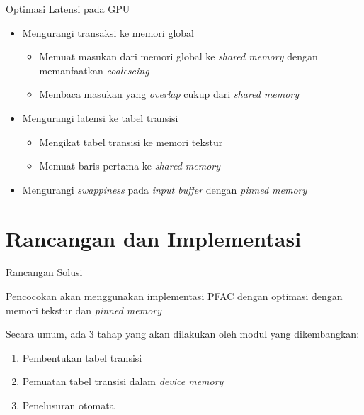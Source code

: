 \documentclass[10pt,xcolor=table]{beamer}
\begin{document}
\begin{frame}{Optimasi Latensi pada GPU}
    \begin{itemize}

        \item Mengurangi transaksi ke memori global
        \begin{itemize}
            \item Memuat masukan dari memori global ke \emph{shared memory} dengan memanfaatkan \emph{coalescing}
            \item Membaca masukan yang \emph{overlap} cukup dari \emph{shared memory}
        \end{itemize}

        \item Mengurangi latensi ke tabel transisi
        \begin{itemize}
            \item Mengikat tabel transisi ke memori tekstur
            \item Memuat baris pertama ke \emph{shared memory}
        \end{itemize}

        \item Mengurangi \emph{swappiness} pada \emph{input buffer} dengan \emph{pinned memory}

    \end{itemize}
\end{frame}

\section{Rancangan dan Implementasi}

\begin{frame}{Rancangan Solusi}
    
    Pencocokan akan menggunakan implementasi PFAC dengan optimasi dengan memori tekstur dan \emph{pinned memory}

    Secara umum, ada 3 tahap yang akan dilakukan oleh modul yang dikembangkan:
    \begin{enumerate}
        
        \item Pembentukan tabel transisi
        
        \item Pemuatan tabel transisi dalam \emph{device memory}
        
        \item Penelusuran otomata

    \end{enumerate}
\end{frame}
\end{document}
